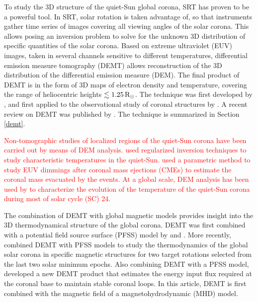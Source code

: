 \documentclass[namedreferences]{solarphysics}
\def\edit#1{\textcolor{Red}{#1}}
\newcommand{\mrsun}{{\rm R_\odot}}
\begin{document}
\begin{article}
To study the {3D structure of the quiet-Sun global corona,} SRT has proven to be a powerful tool. {In SRT, solar rotation is taken advantage of, so that instruments gather time series of images covering all viewing angles of the solar corona. This allows posing an inversion problem to solve for the unknown 3D distribution of specific quantities of the solar corona. Based on extreme ultraviolet (EUV) images, taken in several channels sensitive to different temperatures, differential emission measure tomography (DEMT) allows reconstruction of the 3D distribution of the differential emission measure (DEM). The final product of DEMT is in the form of 3D maps of electron density and temperature, covering the range of heliocentric heights $\lesssim 1.25\,\mrsun$.} The technique was first developed by \citet{frazin_2009}, and first applied to the observational study of coronal structures by \citet{vasquez_2009}. {A recent review on DEMT was published by \citet{vasquez_2016}. The technique is summarized in Section \ref{demt}.} 

\edit{Non-tomographic studies of localized regions of the quiet-Sun corona have been carried out by means of DEM analysis. \citet{mackovjak_2014} used regularized inversion techniques to study characteristic temperatures in the quiet-Sun. \citet{lopez_2019} used a parametric method to study EUV dimmings after coronal mass ejections (CMEs) to estimate the coronal mass evacuated by the events. At a global scale, DEM analysis has been used by \citet{morgan_2017} to characterize the evolution of the temperature of the quiet-Sun corona during most of solar cycle (SC) 24.}

{The combination of DEMT with global magnetic models provides insight} into the 3D thermodynamical structure of the global corona. {DEMT was first combined with a potential field source surface (PFSS) model by \citet{huang_2012} and \citet{nuevo_2013}. More recently,} \citet{lloveras_2017} combined DEMT with PFSS {models to study the thermodynamics of the global solar corona in specific magnetic structures for two target rotations selected from the last two solar minimum epochs. Also combining DEMT with a PFSS model,} \citet{maccormack_2017} developed a new DEMT product that estimates the energy input flux {required at the coronal base to maintain stable coronal loops}. In this article, {DEMT is first combined with the magnetic field of a magnetohydrodynamic (MHD) model.}


\end{article}
\end{document}
